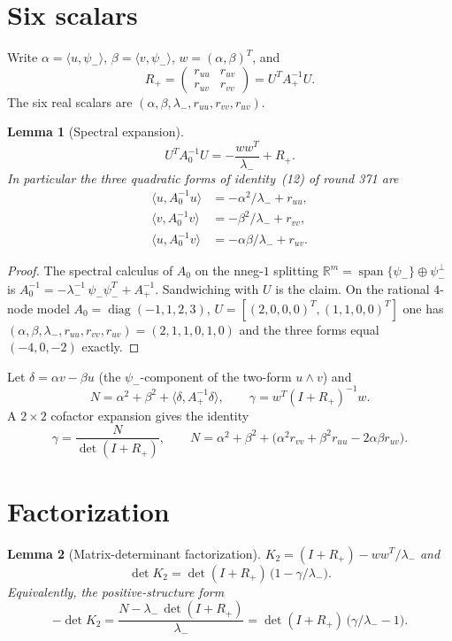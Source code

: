 \documentclass[11pt]{article}
\newtheorem{lemma}{Lemma}
\theoremstyle{remark}
\newcommand{\R}{\mathbb{R}}
\newcommand{\lam}{\lambda_{-}}
\newcommand{\psim}{\psi_{-}}
\newcommand{\Rp}{R_{+}}
\newcommand{\Ap}{A_{+}}
\begin{document}
\section{Six scalars}\label{sec:six}

Write $\alpha=\langle u,\psim\rangle$, $\beta=\langle v,\psim\rangle$,
$w=(\alpha,\beta)^{T}$, and
\[
\Rp
=
\begin{pmatrix} r_{uu} & r_{uv}\\ r_{uv} & r_{vv}\end{pmatrix}
=U^{T}\Ap^{-1}U.
\]
The six real scalars are $(\alpha,\beta,\lam,r_{uu},r_{vv},r_{uv})$.

\begin{lemma}[Spectral expansion]\label{lem:six}
\[
U^{T}A_{0}^{-1}U
=-\frac{ww^{T}}{\lam}+\Rp.
\]
In particular the three quadratic forms of identity~(12) of
round 371 are
\begin{align*}
\langle u,A_{0}^{-1}u\rangle
&=-\alpha^{2}/\lam+r_{uu},\\
\langle v,A_{0}^{-1}v\rangle
&=-\beta^{2}/\lam+r_{vv},\\
\langle u,A_{0}^{-1}v\rangle
&=-\alpha\beta/\lam+r_{uv}.
\end{align*}
\end{lemma}

\begin{proof}
The spectral calculus of $A_{0}$ on the nneg-$1$ splitting
$\R^{m}=\operatorname{span}\{\psim\}\oplus\psim^{\perp}$ is
$A_{0}^{-1}= -\lam^{-1}\,\psim\psim^{T}+\Ap^{-1}$.  Sandwiching
with $U$ is the claim.  On the rational $4$-node model
$A_{0}=\operatorname{diag}(-1,1,2,3)$, $U=[(2,0,0,0)^{T},(1,1,0,0)^{T}]$
one has $(\alpha,\beta,\lam,r_{uu},r_{vv},r_{uv})=(2,1,1,0,1,0)$
and the three forms equal $(-4,0,-2)$ exactly.
\end{proof}

Let $\delta=\alpha v-\beta u$ (the $\psim$-component of the
two-form $u\wedge v$) and
\[
N=\alpha^{2}+\beta^{2}+\langle\delta,\Ap^{-1}\delta\rangle,
\qquad
\gamma=w^{T}(I+\Rp)^{-1}w.
\]
A $2\times2$ cofactor expansion gives the identity
\[
\gamma
=\frac{N}{\det(I+\Rp)},
\qquad
N=\alpha^{2}+\beta^{2}+\bigl(\alpha^{2}r_{vv}+\beta^{2}r_{uu}-2\alpha\beta r_{uv}\bigr).
\]

\section{Factorization}\label{sec:fact}

\begin{lemma}[Matrix-determinant factorization]\label{lem:fact}
$K_{2}=(I+\Rp)-ww^{T}/\lam$ and
\begin{equation}\label{eq:fact}
\det K_{2}
=\det(I+\Rp)\,
\bigl(1-\gamma/\lam\bigr).
\end{equation}
Equivalently, the positive-structure form
\begin{equation}\label{eq:pos}
-\det K_{2}
=\frac{N-\lam\,\det(I+\Rp)}{\lam}
=\det(I+\Rp)\,
\bigl(\gamma/\lam-1\bigr).
\end{equation}
\end{lemma}
\end{document}
